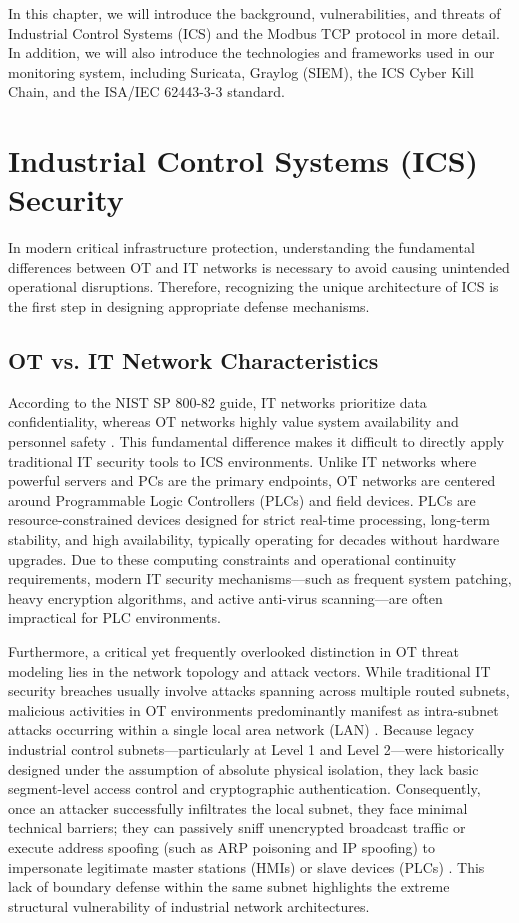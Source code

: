 In this chapter, we will introduce the background, vulnerabilities, and threats of Industrial Control Systems (ICS) and the Modbus TCP protocol in more detail. In addition, we will also introduce the technologies and frameworks used in our monitoring system, including Suricata, Graylog (SIEM), the ICS Cyber Kill Chain, and the ISA/IEC 62443-3-3 standard.

\section{{Industrial Control Systems (ICS) Security} }
In modern critical infrastructure protection, understanding the fundamental differences between OT and IT networks is necessary to avoid causing unintended operational disruptions. Therefore, recognizing the unique architecture of ICS is the first step in designing appropriate defense mechanisms.

\subsection{OT vs. IT Network Characteristics}
According to the NIST SP 800-82 guide, IT networks prioritize data confidentiality, whereas OT networks highly value system availability and personnel safety \cite{ref_report13}. This fundamental difference makes it difficult to directly apply traditional IT security tools to ICS environments. Unlike IT networks where powerful servers and PCs are the primary endpoints, OT networks are centered around Programmable Logic Controllers (PLCs) and field devices. PLCs are resource-constrained devices designed for strict real-time processing, long-term stability, and high availability, typically operating for decades without hardware upgrades. Due to these computing constraints and operational continuity requirements, modern IT security mechanisms—such as frequent system patching, heavy encryption algorithms, and active anti-virus scanning—are often impractical for PLC environments.

Furthermore, a critical yet frequently overlooked distinction in OT threat modeling lies in the network topology and attack vectors. While traditional IT security breaches usually involve attacks spanning across multiple routed subnets, malicious activities in OT environments predominantly manifest as intra-subnet attacks occurring within a single local area network (LAN) \cite{ref_report13}. Because legacy industrial control subnets—particularly at Level 1 and Level 2—were historically designed under the assumption of absolute physical isolation, they lack basic segment-level access control and cryptographic authentication. Consequently, once an attacker successfully infiltrates the local subnet, they face minimal technical barriers; they can passively sniff unencrypted broadcast traffic or execute address spoofing (such as ARP poisoning and IP spoofing) to impersonate legitimate master stations (HMIs) or slave devices (PLCs) \cite{ref_report13}. This lack of boundary defense within the same subnet highlights the extreme structural vulnerability of industrial network architectures.

